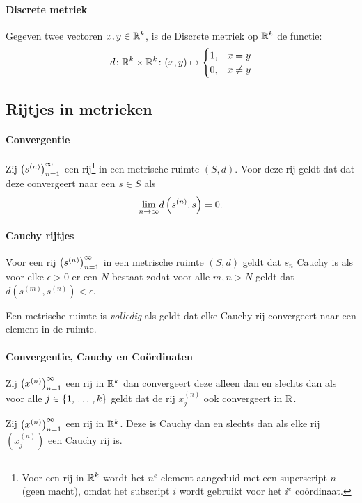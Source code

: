 \paragraph{Discrete metriek} Gegeven twee vectoren \(x,y\in\mathbb{R}^{k}\), is de Discrete metriek op \(\mathbb{R}^{k}\) de functie:
\[
    d\colon\mathbb{R}^{k}\times\mathbb{R}^{k}\colon(x,y)\mapsto\begin{cases}
        1,& x=y\\
        0,& x\neq y
    \end{cases}
\]

\subsection{Rijtjes in metrieken}

\paragraph{Convergentie} Zij \(\left(s^{(n)}\right)_{n=1}^{\infty}\) een rij\footnote{Voor een rij in \(\mathbb{R}^{k}\) wordt het \(n^{e}\) element aangeduid met een superscript \(n\) (geen macht), omdat het subscript \(i\) wordt gebruikt voor het \(i^{e}\) coördinaat.} in een metrische ruimte \((S,d)\). Voor deze rij geldt dat dat deze convergeert naar een \(s\in S\) als 
\[
    \underset{n\to\infty}{\text{lim}}d\left(s^{(n)},s\right)=0.
\]

\paragraph{Cauchy rijtjes} Voor een rij \(\left(s^{(n)}\right)_{n=1}^{\infty}\) in een metrische ruimte \((S,d)\) geldt dat \(s_{n}\) Cauchy is als voor elke \(\epsilon>0\) er een \(N\) bestaat zodat voor alle \(m,n>N\) geldt dat \(d\left(s^{(m)},s^{(n)}\right)<\epsilon\).

Een metrische ruimte is \emph{volledig} als geldt dat elke Cauchy rij convergeert naar een element in de ruimte.

\paragraph{Convergentie, Cauchy en Coördinaten} Zij \(\left(x^{(n)}\right)_{n=1}^{\infty}\) een rij in \(\mathbb{R}^{k}\) dan convergeert deze alleen dan en slechts dan als voor alle \(j\in\{1,\,\dots\,,k\}\) geldt dat de rij \(x^{(n)}_{j}\) ook convergeert in \(\mathbb{R}\).

Zij \(\left(x^{(n)}\right)_{n=1}^{\infty}\) een rij in \(\mathbb{R}^{k}\). Deze is Cauchy dan en slechts dan als elke rij \((x_{j}^{(n)})\) een Cauchy rij is.


